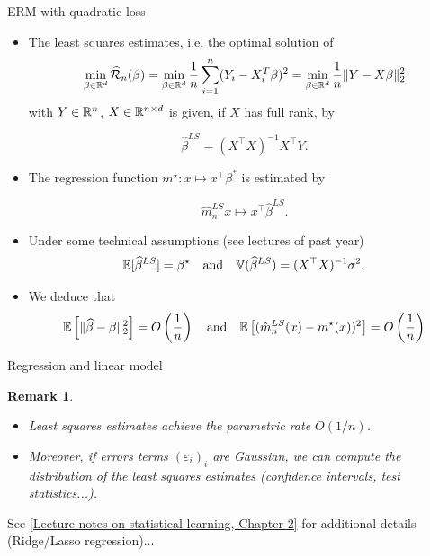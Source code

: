 \documentclass[xcolor={usenames,dvipsnames},handout]{beamer}
\newtheorem{remark}[theorem]{Remark}
\begin{document}
\begin{frame}{ERM with quadratic loss} 


\begin{itemize}
\item The least squares estimates, i.e. the optimal solution of
$$
\min_{\beta \in \mathbb{R}^d} \widehat{{\mathcal{R}}}_n (\beta) = \min_{\beta \in \mathbb{R}^d} \frac{1}{n} \sum_{i=1}^n (Y_i - X_i^T \beta)^2 =  \min_{\beta \in \mathbb{R}^d}  \frac{1}{n}\| Y - X \beta \|_2^2
$$
with $Y\in\mathbb{R}^n$, $X\in \mathbb{R}^{n\times d}$ is given, if $X$ has full rank, by
 
$$
\widehat{\beta}^{LS}  = (X^\top X)^{-1} X^\top Y.
$$
\item The regression function $m^\star: x \mapsto x^\top \beta^*$ is estimated by

$$
\widehat{m}_n^{LS} x \mapsto  x^\top \widehat{\beta}^{LS}.
$$
\item Under some technical assumptions (see lectures of past year)
$$
\mathbb{E} [ \widehat{\beta}^{LS}  ] = \beta^\star \quad \text{and} \quad \mathbb{V} (\widehat{\beta}^{LS}   ) = (X^\top X)^{-1} \sigma^2.
$$
\item We deduce that
$$
\mathbb{E} \left[ \| \widehat{\beta} - \beta \|_2^2 \right] = O \left( \frac{1}{n} \right) \quad \text{and} \quad \mathbb{E} \left[ ( \hat{m}_n^{LS}(x) - m^\star(x) )^2 \right] = O \left( \frac{1}{n} \right) 
$$
\end{itemize}
\end{frame}

\begin{frame}{Regression and linear model}
\begin{remark}  
\begin{itemize}
\item Least squares estimates achieve the parametric rate $O(1/n)$.
\item Moreover, if errors terms $(\varepsilon_i)_i$ are Gaussian, we can compute the distribution of the least squares estimates (confidence intervals, test statistics...).
\end{itemize}
\end{remark}

\vspace{.3cm}

{\color{Vert} See \href{https://sylvainlc.github.io/}{[Lecture notes on statistical learning, Chapter 2]} for additional details (Ridge/Lasso  regression)...}
\end{frame}
\end{document}
